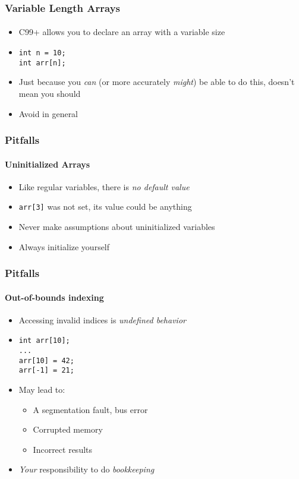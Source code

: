 \documentclass[]{beamer}
\begin{document}
\begin{frame}[fragile]
    \frametitle{Variable Length Arrays}
    \framesubtitle{}

\begin{itemize}[<+->]
  \item C99+ allows you to declare an array with a variable size
  \item[~]
\begin{verbatim}
int n = 10;
int arr[n];
\end{verbatim}
  \item Just because you \emph{can} (or more accurately \emph{might}) 
    be able to do this, doesn't mean you should
  \item Avoid in general
\end{itemize}

\end{frame}

\begin{frame}[fragile]
    \frametitle{Pitfalls}
    \framesubtitle{Uninitialized Arrays}

\begin{itemize}[<+->]
  \item Like regular variables, there is \emph{no default value}
  \item \texttt{arr[3]} was not set, its value could be anything
  \item Never make assumptions about uninitialized variables
  \item Always initialize yourself
\end{itemize}

\end{frame}

\begin{frame}[fragile]
    \frametitle{Pitfalls}
    \framesubtitle{Out-of-bounds indexing}

\begin{itemize}[<+->]  
  \item Accessing invalid indices is \emph{undefined behavior}
  \item[~]
\begin{verbatim}
int arr[10];
...
arr[10] = 42;
arr[-1] = 21;
\end{verbatim}
  \item May lead to:
  \begin{itemize}
    \item A segmentation fault, bus error
    \item Corrupted memory
    \item Incorrect results
  \end{itemize}
  \item \emph{Your} responsibility to do \emph{bookkeeping}
\end{itemize}

\end{frame}
\end{document}
